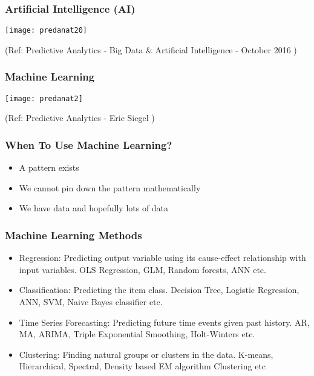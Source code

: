 \begin{frame}\frametitle{Artificial	Intelligence	(AI)}

\begin{center}
\texttt{[image: predanat20]}
\end{center}

{\tiny (Ref: Predictive Analytics - Big	Data	\&	Artificial	Intelligence - October 2016 )}

\end{frame}


\begin{frame}\frametitle{Machine Learning}

\begin{center}
\texttt{[image: predanat2]}
\end{center}

{\tiny (Ref: Predictive Analytics - Eric Siegel )}

\end{frame}

\begin{frame}\frametitle{When	To	Use	Machine	Learning?}

\begin{itemize}
\item A	pattern	exists
\item We	cannot	pin	down	the	pattern	
mathematically
\item We	have	data	and	hopefully	lots	of	
data
\end{itemize}

\end{frame}

\begin{frame}\frametitle{Machine Learning Methods}

\begin{itemize}
\item Regression: Predicting output variable using its cause-effect relationship with
input variables. OLS Regression, GLM, Random forests, ANN etc.
\item Classification: Predicting the item class. Decision Tree, Logistic Regression, ANN,
SVM, Naive Bayes classifier etc.
\item Time Series Forecasting: Predicting future time events given past history. AR, MA, ARIMA,
Triple Exponential Smoothing, Holt-Winters etc.
\item Clustering:
Finding natural groups or clusters in the data. K-means, Hierarchical, Spectral, Density based EM algorithm Clustering etc
\end{itemize}

\end{frame}


